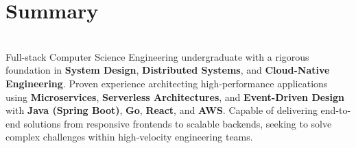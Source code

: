 \MainDivider
\section*{Summary}
\BigDivider\\
\noindent
Full-stack Computer Science Engineering undergraduate with a rigorous foundation in \textbf{System Design}, \textbf{Distributed Systems}, and \textbf{Cloud-Native Engineering}. Proven experience architecting high-performance applications using \textbf{Microservices}, \textbf{Serverless Architectures}, and \textbf{Event-Driven Design} with \textbf{Java (Spring Boot)}, \textbf{Go}, \textbf{React}, and \textbf{AWS}. Capable of delivering end-to-end solutions from responsive frontends to scalable backends, seeking to solve complex challenges within high-velocity engineering teams.
